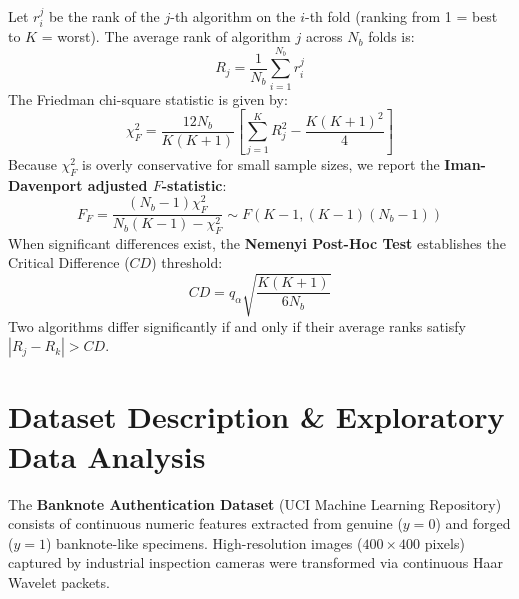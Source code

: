 \documentclass[12pt,a4paper]{article}
\begin{document}
Let $r_i^j$ be the rank of the $j$-th algorithm on the $i$-th fold (ranking from 1 = best to $K$ = worst). The average rank of algorithm $j$ across $N_b$ folds is:
\begin{equation}
R_j = \frac{1}{N_b} \sum_{i=1}^{N_b} r_i^j
\end{equation}
The Friedman chi-square statistic is given by:
\begin{equation}
\chi_F^2 = \frac{12 N_b}{K(K + 1)} \left[ \sum_{j=1}^K R_j^2 - \frac{K(K + 1)^2}{4} \right]
\end{equation}
Because $\chi_F^2$ is overly conservative for small sample sizes, we report the \textbf{Iman-Davenport adjusted $F$-statistic}:
\begin{equation}
F_F = \frac{(N_b - 1) \chi_F^2}{N_b(K - 1) - \chi_F^2} \sim F(K - 1, (K - 1)(N_b - 1))
\end{equation}
When significant differences exist, the \textbf{Nemenyi Post-Hoc Test} establishes the Critical Difference ($CD$) threshold:
\begin{equation}
CD = q_\alpha \sqrt{\frac{K(K + 1)}{6 N_b}}
\end{equation}
Two algorithms differ significantly if and only if their average ranks satisfy $|R_j - R_k| > CD$.

\section{Dataset Description \& Exploratory Data Analysis}
The \textbf{Banknote Authentication Dataset} (UCI Machine Learning Repository) consists of continuous numeric features extracted from genuine ($y=0$) and forged ($y=1$) banknote-like specimens. High-resolution images ($400 \times 400$ pixels) captured by industrial inspection cameras were transformed via continuous Haar Wavelet packets.

\begin{table}[H]
\centering
\caption{Dataset Attributes and Summary Statistics (N = 1,372)}
\end{table}
\end{document}
